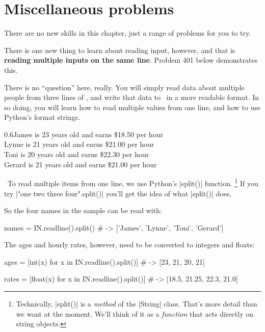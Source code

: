 
\chapter{Miscellaneous problems}

There are no new skills in this chapter, just a range of problems for you to try.

There is one new thing to learn about reading input, however, and that is \textbf{reading
multiple inputs on the same line}. Problem 401 below demonstrates this.




There is no ``question'' here, really. You will simply read data about multiple people
from three lines of \IN, and write that data to \OUT\ in a more readable format. In so
doing, you will learn how to read multiple values from one line, and how to use Python's
format strings.

\Sample

       {0.6}{James is 23 years old and earns \$18.50 per hour\\
             Lynne is 21 years old and earns \$21.00 per hour\\
             Toni is 20 years old and earns \$22.30 per hour\\
             Gerard is 21 years old and earns \$21.00 per hour}

\Scratch\ To read multiple items from one line, we use Python's \pycode|split()| function.%
\footnote{Technically, \pycode|split()| is a \emph{method} of the \pycode|String| class.
That's more detail than we want at the moment. We'll think of it as a \emph{function} that
acts directly on string objects.}
If you try \pycode|"one two three four".split()| you'll get the idea of what
\pycode|split()| does.

So the four names in the sample can be read with:
\begin{pythoncode}
  names = IN.readline().split()
             # -> ['James', 'Lynne', 'Toni', 'Gerard']
\end{pythoncode}

The ages and hourly rates, however, need to be converted to integers and floats:
\begin{pythoncode}
  ages  = [int(x) for x in IN.readline().split()]
             # -> [23, 21, 20, 21]

  rates = [float(x) for x in IN.readline().split()]
             # -> [18.5, 21.25, 22.3, 21.0]
\end{pythoncode}

